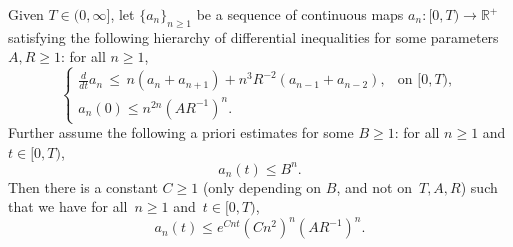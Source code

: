 \documentclass[10pt,a4paper]{amsart}
\newcommand{\R}{\mathbb R}
\begin{document}
\begin{lem}\label{lem:hier}
Given $T\in(0,\infty]$, let $\{a_n\}_{n\ge1}$ be a sequence of continuous maps $a_n:[0,T)\to\R^+$ satisfying the following hierarchy of differential inequalities for some parameters~$A,R\ge1$: for all $n\ge1$,
\begin{equation}\label{eq:ineq-an}
\left\{\begin{array}{ll}
\tfrac{d}{dt}a_n\,\le\,
n(a_n+a_{n+1})
+n^3R^{-2}(a_{n-1}+a_{n-2}),&\text{on $[0,T)$},\\[1mm]
a_n(0)\le n^{2n}(AR^{-1} )^n.&
\end{array}\right.
\end{equation}
Further assume the following a priori estimates for some $B\ge1$: for all $n\ge1$ and $t\in[0,T)$,
\begin{equation}\label{eq:apriori-an}
a_n(t)\le B^n.
\end{equation}
Then there is a constant $C\ge1$ (only depending on $B$, and not on~$T,A,R$) such that we have for all~$n\ge1$ and~$t\in[0,T)$,
\begin{equation}\label{eq:todo-an}
a_n(t)\le e^{Cnt}(Cn^2)^n(AR^{-1})^n.
\end{equation}
\end{lem}
\end{document}

